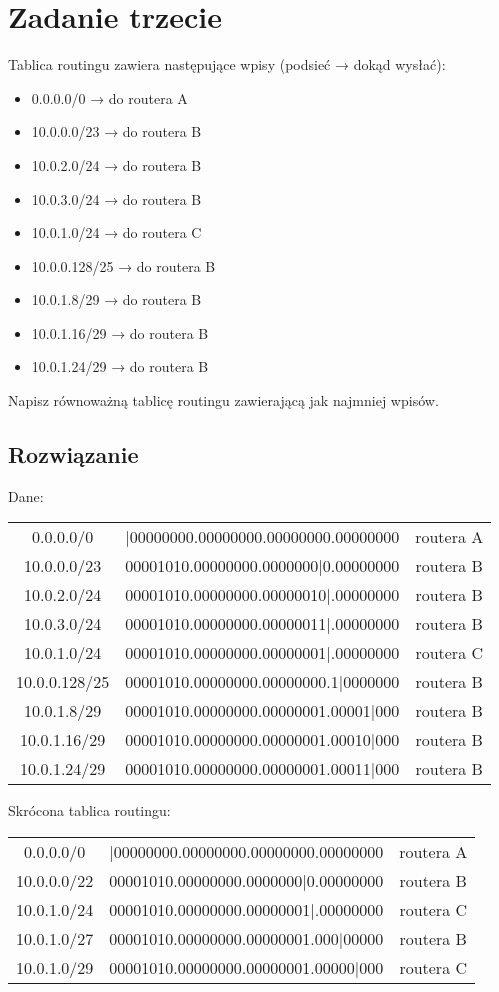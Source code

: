 \documentclass[a4paper]{article}
\begin{document}
\section{Zadanie trzecie}
Tablica routingu zawiera następujące wpisy (podsieć → dokąd wysłać):
\begin{itemize}
\item 0.0.0.0/0 → do routera A
\item 10.0.0.0/23 → do routera B
\item 10.0.2.0/24 → do routera B
\item 10.0.3.0/24 → do routera B
\item 10.0.1.0/24 → do routera C
\item 10.0.0.128/25 → do routera B
\item 10.0.1.8/29 → do routera B
\item 10.0.1.16/29 → do routera B
\item 10.0.1.24/29 → do routera B
\end{itemize}
Napisz równoważną tablicę routingu zawierającą jak najmniej wpisów.


\subsection{Rozwiązanie}
Dane:
\begin{center}
\begin{tabular}{ |c|c|c| } 
 \hline
 0.0.0.0/0 & |00000000.00000000.00000000.00000000 & routera A \\ 
 10.0.0.0/23 & 00001010.00000000.0000000|0.00000000 & routera B \\ 
 10.0.2.0/24 & 00001010.00000000.00000010|.00000000 & routera B \\
10.0.3.0/24 & 00001010.00000000.00000011|.00000000 & routera B \\
10.0.1.0/24 & 00001010.00000000.00000001|.00000000 & routera C \\
10.0.0.128/25 & 00001010.00000000.00000000.1|0000000 & routera B\\
10.0.1.8/29 & 00001010.00000000.00000001.00001|000 & routera B\\
10.0.1.16/29 & 00001010.00000000.00000001.00010|000 & routera B\\
10.0.1.24/29 & 00001010.00000000.00000001.00011|000 & routera B\\
 \hline
\end{tabular}
\end{center}
Skrócona tablica routingu:
\begin{center}
\begin{tabular}{ |c|c|c| } 
 \hline
 0.0.0.0/0 & |00000000.00000000.00000000.00000000 & routera A \\ 
 10.0.0.0/22 & 00001010.00000000.0000000|0.00000000 & routera B \\ 
10.0.1.0/24 & 00001010.00000000.00000001|.00000000 & routera C \\
10.0.1.0/27 & 00001010.00000000.00000001.000|00000 & routera B\\
10.0.1.0/29 & 00001010.00000000.00000001.00000|000 & routera C\\
 \hline
\end{tabular}
\end{center}
\end{document}
